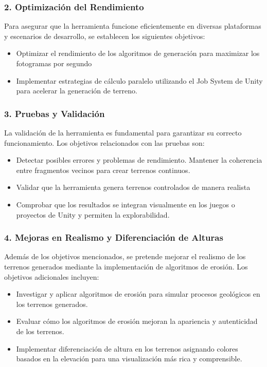 \subsubsection{2. Optimización del Rendimiento}

Para asegurar que la herramienta funcione eficientemente en diversas plataformas y escenarios de desarrollo, se establecen los siguientes objetivos: 

\begin{itemize}
    \item Optimizar el rendimiento de los algoritmos de generación para maximizar los fotogramas por segundo
    \item Implementar estrategias de cálculo paralelo utilizando el Job System de Unity para acelerar la generación de terreno.
\end{itemize}

\subsubsection{3. Pruebas y Validación}

La validación de la herramienta es fundamental para garantizar su correcto funcionamiento. Los objetivos relacionados con las pruebas son:

\begin{itemize}
    \item Detectar posibles errores y problemas de rendimiento. Mantener la coherencia entre fragmentos vecinos para crear terrenos continuos.
    \item Validar que la herramienta genera terrenos controlados de manera realista
    \item Comprobar que los resultados se integran visualmente en los juegos o proyectos de Unity y permiten la explorabilidad. 
\end{itemize}

\subsubsection{4. Mejoras en Realismo y Diferenciación de Alturas}

Además de los objetivos mencionados, se pretende mejorar el realismo de los terrenos generados mediante la implementación de algoritmos de erosión. Los objetivos adicionales incluyen:

\begin{itemize}
    \item Investigar y aplicar algoritmos de erosión para simular procesos geológicos en los terrenos generados.
    \item Evaluar cómo los algoritmos de erosión mejoran la apariencia y autenticidad de los terrenos.
    \item Implementar diferenciación de altura en los terrenos asignando colores basados en la elevación para una visualización más rica y comprensible.
\end{itemize}

